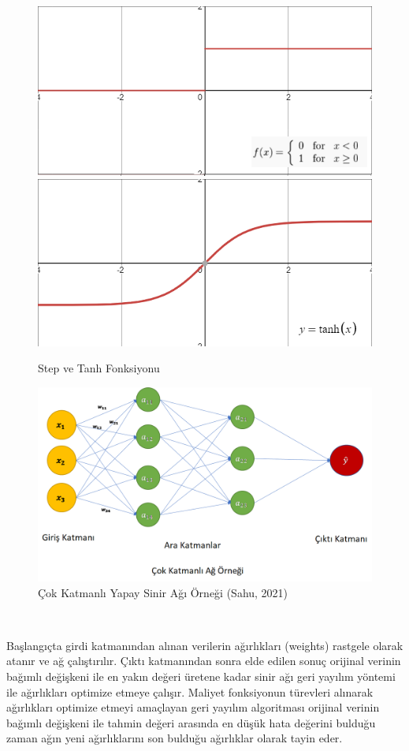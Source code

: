 \documentclass[12pt,twoside]{deuthesis}
\begin{document}
\begin{figure}

{\centering \includegraphics[width=0.49\linewidth,height=0.18\textheight]{figure/step} \includegraphics[width=0.49\linewidth,height=0.18\textheight]{figure/tanh} 

}

\caption{Step ve Tanh Fonksiyonu }\label{fig:unnamed-chunk-10}
\end{figure}
\begin{figure}

{\centering \includegraphics[width=1\linewidth,height=0.4\textheight]{figure/cok_katmanli} 

}

\caption{Çok Katmanlı Yapay Sinir Ağı Örneği (Sahu, 2021)}\label{fig:unnamed-chunk-11}
\end{figure}
~
~

Başlangıçta girdi katmanından alınan verilerin ağırlıkları (weights) rastgele olarak atanır ve ağ çalıştırılır. Çıktı katmanından sonra elde edilen sonuç orijinal verinin bağımlı değişkeni ile en yakın değeri üretene kadar sinir ağı geri yayılım yöntemi ile ağırlıkları optimize etmeye çalışır. Maliyet fonksiyonun türevleri alınarak ağırlıkları optimize etmeyi amaçlayan geri yayılım algoritması orijinal verinin bağımlı değişkeni ile tahmin değeri arasında en düşük hata değerini bulduğu zaman ağın yeni ağırlıklarını son bulduğu ağırlıklar olarak tayin eder.\\
\end{document}
